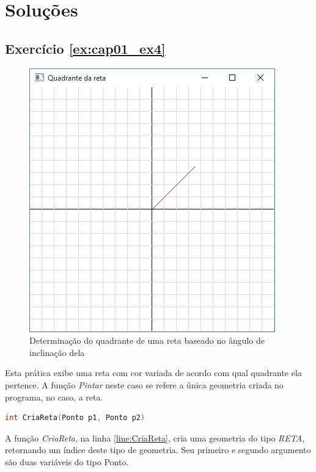 \section*{Soluções}

\subsection*{Exercício \ref{ex:cap01_ex4}}
\begin{figure}[ht]
  \centerline{\includegraphics[width=.5\textwidth]{img/cap1_ex4.png}}
  \caption{Determinação do quadrante de uma reta baseado no ângulo de inclinação dela}
  \label{fig:cap01_ex4}
\end{figure}
Esta prática exibe uma reta com cor variada de acordo com qual quadrante ela pertence. A função \emph{Pintar} neste caso se refere a única geometria criada no programa, no caso, a reta.



\begin{lstlisting}[label={func:CriaReta},language=C++]
int CriaReta(Ponto p1, Ponto p2)
\end{lstlisting}
A função \emph{CriaReta}, na linha \ref{line:CriaReta}, cria uma geometria do tipo \emph{RETA}, retornando um índice deste tipo de geometria. Seu primeiro e segundo argumento são duas variáveis do tipo Ponto.

